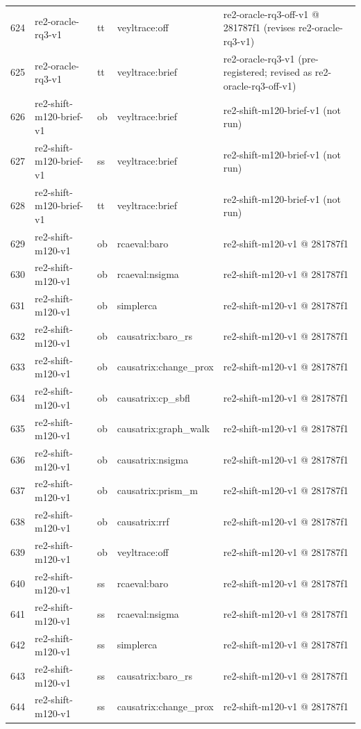 \begin{longtable}{@{}r>{\raggedright\arraybackslash}p{87.0pt}>{\raggedright\arraybackslash}p{18.0pt}>{\raggedright\arraybackslash}p{63.0pt}>{\raggedright\arraybackslash}p{108.0pt}@{}}
624 & re2-oracle-rq3-v1 & tt & veyltrace:off & re2-oracle-rq3-off-v1 @ 281787f1 (revises re2-oracle-rq3-v1) \\
625 & re2-oracle-rq3-v1 & tt & veyltrace:brief & re2-oracle-rq3-v1 (pre-registered; revised as re2-oracle-rq3-off-v1) \\
626 & re2-shift-m120-brief-v1 & ob & veyltrace:brief & re2-shift-m120-brief-v1 (not run) \\
627 & re2-shift-m120-brief-v1 & ss & veyltrace:brief & re2-shift-m120-brief-v1 (not run) \\
628 & re2-shift-m120-brief-v1 & tt & veyltrace:brief & re2-shift-m120-brief-v1 (not run) \\
629 & re2-shift-m120-v1 & ob & rcaeval:baro & re2-shift-m120-v1 @ 281787f1 \\
630 & re2-shift-m120-v1 & ob & rcaeval:nsigma & re2-shift-m120-v1 @ 281787f1 \\
631 & re2-shift-m120-v1 & ob & simplerca & re2-shift-m120-v1 @ 281787f1 \\
632 & re2-shift-m120-v1 & ob & causatrix:baro\_rs & re2-shift-m120-v1 @ 281787f1 \\
633 & re2-shift-m120-v1 & ob & causatrix:change\_prox & re2-shift-m120-v1 @ 281787f1 \\
634 & re2-shift-m120-v1 & ob & causatrix:cp\_sbfl & re2-shift-m120-v1 @ 281787f1 \\
635 & re2-shift-m120-v1 & ob & causatrix:graph\_walk & re2-shift-m120-v1 @ 281787f1 \\
636 & re2-shift-m120-v1 & ob & causatrix:nsigma & re2-shift-m120-v1 @ 281787f1 \\
637 & re2-shift-m120-v1 & ob & causatrix:prism\_m & re2-shift-m120-v1 @ 281787f1 \\
638 & re2-shift-m120-v1 & ob & causatrix:rrf & re2-shift-m120-v1 @ 281787f1 \\
639 & re2-shift-m120-v1 & ob & veyltrace:off & re2-shift-m120-v1 @ 281787f1 \\
640 & re2-shift-m120-v1 & ss & rcaeval:baro & re2-shift-m120-v1 @ 281787f1 \\
641 & re2-shift-m120-v1 & ss & rcaeval:nsigma & re2-shift-m120-v1 @ 281787f1 \\
642 & re2-shift-m120-v1 & ss & simplerca & re2-shift-m120-v1 @ 281787f1 \\
643 & re2-shift-m120-v1 & ss & causatrix:baro\_rs & re2-shift-m120-v1 @ 281787f1 \\
644 & re2-shift-m120-v1 & ss & causatrix:change\_prox & re2-shift-m120-v1 @ 281787f1 \\

\end{longtable}
